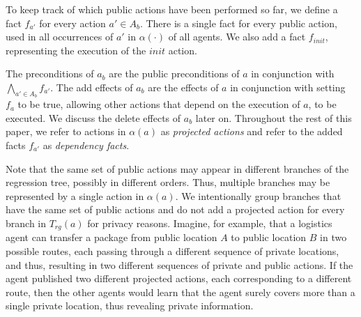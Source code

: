 \documentclass[letterpaper]{article}
\theoremstyle{definition}
\begin{document}
To keep track of which public actions have been performed so far, we define a fact $f_{a'}$ for every action $a'\in A_b$. There is a single fact for every public action, used in all occurrences of $a'$ in $\alpha(\cdot)$ of all agents. We also add a fact $f_{init}$, representing the execution of the $init$ action. 

The preconditions of $a_b$ are the public preconditions of $a$  
in conjunction with $\bigwedge_{a' \in A_b}f_{a'}$. 
The add effects of $a_b$ are the effects of $a$ in conjunction with setting $f_a$ to be true, allowing other actions that depend on the execution of $a$, to be executed. We discuss the delete effects of $a_b$ later on. 
Throughout the rest of this paper, we refer to actions in $\alpha(a)$ as {\em projected actions} and refer to the added facts $f_{a'}$ as {\em dependency facts}.




Note that the same set of public actions may appear in different branches of the regression tree, possibly in different orders. Thus, multiple branches may be represented by a single action in $\alpha(a)$. 
We intentionally group branches that have the same set of public actions and do not add a projected action for every branch in $T_{rg}(a)$ for privacy reasons. Imagine, for example, that a logistics agent can transfer a package from public location $A$ to public location $B$ in two possible routes, each passing through a different sequence of private locations, and thus, resulting in two different sequences of private and public actions. If the agent published two different projected actions, each corresponding to a different route, then the other agents would learn that the agent surely covers more than a single private location, thus revealing private information.
\end{document}
